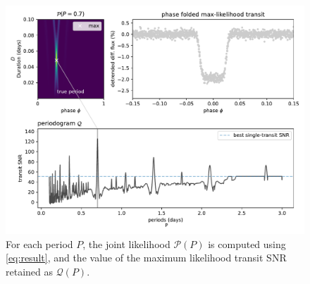 \documentclass{aastex631}
\begin{document}
\begin{figure}[H]
    \begin{centering}
        \includegraphics[width=0.8\linewidth]{principle_Q.pdf}
        \caption{For each period $P$, the joint likelihood $\mathcal{P}(P)$ is computed using \autoref{eq:result}, and the value of the maximum likelihood transit SNR retained as $\mathcal{Q}(P)$.}
        \label{fig:periodogram}
    \end{centering}
\end{figure}
\end{document}

